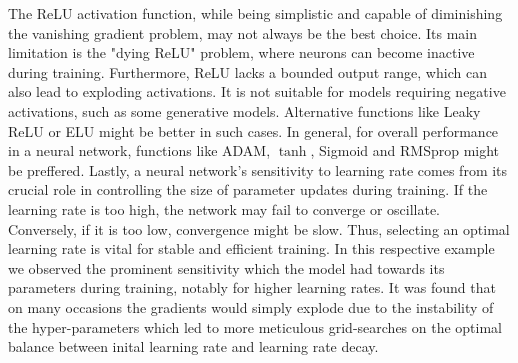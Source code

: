 The ReLU activation function, while being simplistic and capable of diminishing the vanishing gradient problem, may not always be the best choice. Its main limitation is the "dying ReLU" problem, where neurons can become inactive during training. Furthermore, ReLU lacks a bounded output range, which can also lead to exploding activations. It is not suitable for models requiring negative activations, such as some generative models. Alternative functions like Leaky ReLU or ELU might be better in such cases. In general, for overall performance in a neural network, functions like ADAM, $\tanh$, Sigmoid and RMSprop might be preffered. \spaze 
Lastly, a neural network's sensitivity to learning rate comes from its crucial role in controlling the size of parameter updates during training. If the learning rate is too high, the network may fail to converge or oscillate. Conversely, if it is too low, convergence might be slow. Thus, selecting an optimal learning rate is vital for stable and efficient training. In this respective example we observed the prominent sensitivity which the model had towards its parameters during training, notably for higher learning rates. It was found that on many occasions the gradients would simply explode due to the instability of the hyper-parameters which led to more meticulous grid-searches on the optimal balance between inital learning rate and learning rate decay.